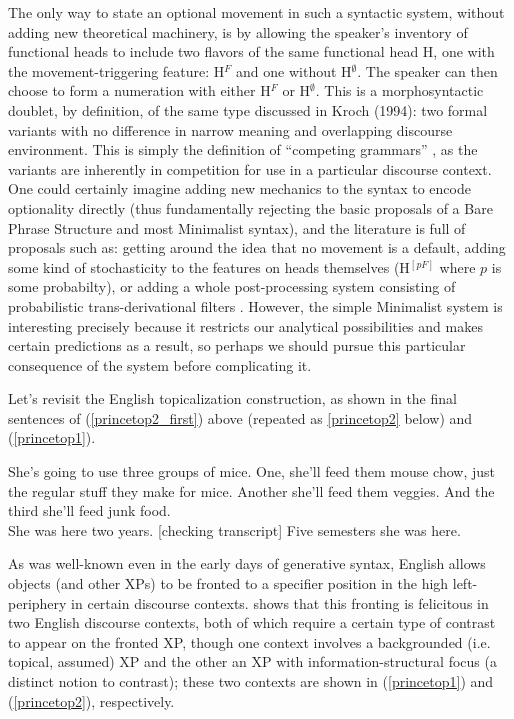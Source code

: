 The only way to state an optional movement in such a syntactic system, without adding new theoretical machinery, is by allowing the speaker's inventory of functional heads to include two flavors of the same functional head H, one with the movement-triggering feature: H$^F$ and one without H$^\emptyset$.
The speaker can then choose to form a numeration with either H$^F$ or H$^\emptyset$.
This is a morphosyntactic doublet, by definition, of the same type discussed in Kroch (1994): two formal variants with no difference in narrow meaning and overlapping discourse environment.
This is simply the definition of ``competing grammars'' \citep{kroch1994}, as the variants are inherently in competition for use in a particular discourse context.
One could certainly imagine adding new mechanics to the syntax to encode optionality directly (thus fundamentally rejecting the basic proposals of a Bare Phrase Structure \citep{chomsky1995} and most Minimalist syntax), and the literature is full of proposals such as: getting around the idea that no movement is a default, adding some kind of stochasticity to the features on heads themselves (H$^{[pF]}$ where $p$ is some probabilty), or adding a whole post-processing system consisting of probabilistic trans-derivational filters .
However, the simple Minimalist system is interesting precisely because it restricts our analytical possibilities and makes certain predictions as a result, so perhaps we should pursue this particular consequence of the system before complicating it.

Let's revisit the English topicalization construction, as shown in the final sentences of (\ref{princetop2_first}) above (repeated as \ref{princetop2} below) and (\ref{princetop1}).

\begin{exe}
\ex \label{princetop1} She's going to use three groups of mice.
One, she'll feed them mouse chow, just the regular stuff they make for
mice.
Another she'll feed them veggies.
And the third she'll feed junk food.\\

\ex \label{princetop2} She was here two years.
[checking transcript] Five semesters she was here.\\
\citep[both examples from][8,9]{prince1999} 

\end{exe}

\noindent As was well-known even in the early days of generative syntax, English allows objects (and other XPs) to be fronted to a specifier position in the high left-periphery in certain discourse contexts.
\citet{prince1985,prince1998, prince1999} shows that this fronting is felicitous in two English discourse contexts, both of which require a certain type of contrast to appear on the fronted XP, though one context involves a backgrounded (i.e. topical, assumed) XP and the other an XP with information-structural focus (a distinct notion to contrast); these two contexts are shown in (\ref{princetop1}) and (\ref{princetop2}), respectively.

